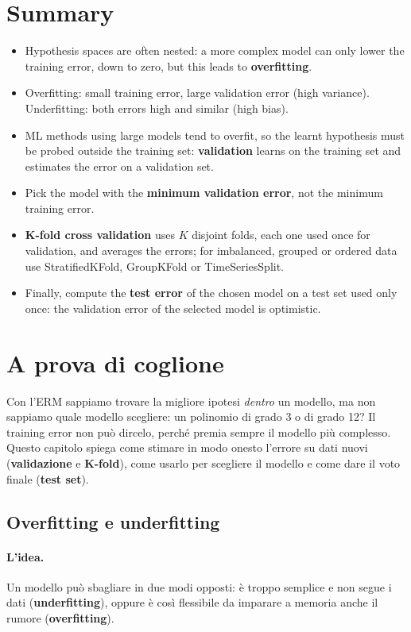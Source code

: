 \section{Summary}
\begin{itemize}
    \item Hypothesis spaces are often nested: a more complex model can only lower the training error, down to zero, but this leads to \textbf{overfitting}.
    \item Overfitting: small training error, large validation error (high variance). Underfitting: both errors high and similar (high bias).
    \item ML methods using large models tend to overfit, so the learnt hypothesis must be probed outside the training set: \textbf{validation} learns on the training set and estimates the error on a validation set.
    \item Pick the model with the \textbf{minimum validation error}, not the minimum training error.
    \item \textbf{K-fold cross validation} uses $K$ disjoint folds, each one used once for validation, and averages the errors; for imbalanced, grouped or ordered data use StratifiedKFold, GroupKFold or TimeSeriesSplit.
    \item Finally, compute the \textbf{test error} of the chosen model on a test set used only once: the validation error of the selected model is optimistic.
\end{itemize}



\section{A prova di coglione}
Con l'ERM sappiamo trovare la migliore ipotesi \emph{dentro} un modello, ma non sappiamo quale modello scegliere: un polinomio di grado 3 o di grado 12? Il training error non può dircelo, perché premia sempre il modello più complesso. Questo capitolo spiega come stimare in modo onesto l'errore su dati nuovi (\textbf{validazione} e \textbf{K-fold}), come usarlo per scegliere il modello e come dare il voto finale (\textbf{test set}).

\subsection{Overfitting e underfitting}
\paragraph*{L'idea.} Un modello può sbagliare in due modi opposti: è troppo semplice e non segue i dati (\textbf{underfitting}), oppure è così flessibile da imparare a memoria anche il rumore (\textbf{overfitting}).


